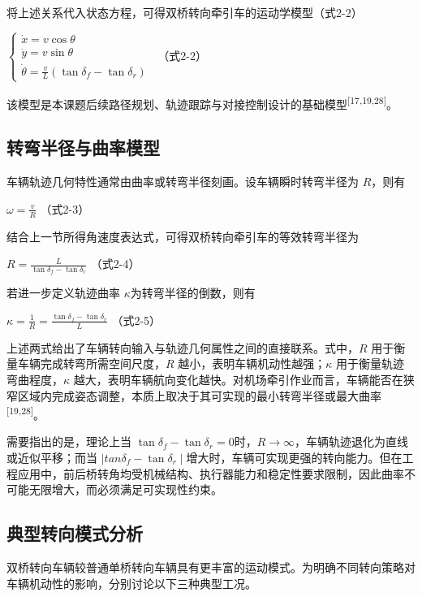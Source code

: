 \documentclass[UTF8,a4paper,12pt]{ctexart}
\begin{document}
将上述关系代入状态方程，可得双桥转向牵引车的运动学模型（式2-2）

\(\left\{ \begin{array}{r}
\dot{x} = v\cos\theta \\
\dot{y} = v\sin\theta \\
\dot{\theta} = \frac{v}{L}\left( \tan\delta_{f} - \tan\delta_{r} \right)
\end{array} \right.\ \) （式2-2）

该模型是本课题后续路径规划、轨迹跟踪与对接控制设计的基础模型\textsuperscript{[17,19,28]}。

\subsection{转弯半径与曲率模型}\label{_Toc229105301}

车辆轨迹几何特性通常由曲率或转弯半径刻画。设车辆瞬时转弯半径为 \(R\)，则有

\(\omega = \frac{v}{R}\) （式2-3）

结合上一节所得角速度表达式，可得双桥转向牵引车的等效转弯半径为

\(R = \frac{L}{\tan\delta_{f} - \tan\delta_{r}}\) （式2-4）

若进一步定义轨迹曲率 \(\kappa\)为转弯半径的倒数，则有

\(\kappa = \frac{1}{R} = \frac{\tan\delta_{f} - \tan\delta_{r}}{L}\) （式2-5）

上述两式给出了车辆转向输入与轨迹几何属性之间的直接联系。式中，\(R\) 用于衡量车辆完成转弯所需空间尺度，\(R\) 越小，表明车辆机动性越强；\(\kappa\) 用于衡量轨迹弯曲程度，\(\kappa\) 越大，表明车辆航向变化越快。对机场牵引作业而言，车辆能否在狭窄区域内完成姿态调整，本质上取决于其可实现的最小转弯半径或最大曲率\textsuperscript{[19,28]}。

需要指出的是，理论上当 \(\tan\delta_{f} - \tan\delta_{r} = 0\)时，\(R \rightarrow \infty\)，车辆轨迹退化为直线或近似平移；而当 \(\mid tan\delta_{f} - \tan\delta_{r} \mid\)增大时，车辆可实现更强的转向能力。但在工程应用中，前后桥转角均受机械结构、执行器能力和稳定性要求限制，因此曲率不可能无限增大，而必须满足可实现性约束。

\subsection{典型转向模式分析}\label{_Toc229105302}

双桥转向车辆较普通单桥转向车辆具有更丰富的运动模式。为明确不同转向策略对车辆机动性的影响，分别讨论以下三种典型工况。
\end{document}
